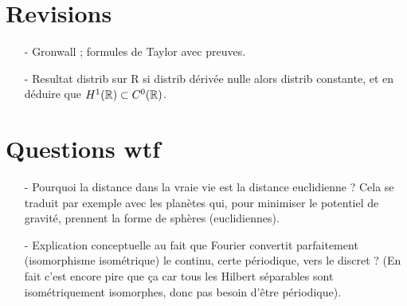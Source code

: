 \documentclass[11pt,a4paper]{article}
\begin{document}
\section{Revisions}
\begin{itemize}
\item[-] Gronwall ; formules de Taylor avec preuves.
\item[-] Resultat distrib sur R si distrib dérivée nulle alors distrib constante, et en déduire que $H^1(\mathbb R) \subset C^0(\mathbb R)$.
\end{itemize}

\section{Questions wtf}
\begin{itemize}
\item[-] Pourquoi la distance dans la vraie vie est la distance euclidienne ? Cela se traduit par exemple avec les planètes qui, pour minimiser le potentiel de gravité, prennent la forme de sphères (euclidiennes). \\
\item[-] Explication conceptuelle au fait que Fourier convertit parfaitement (isomorphisme isométrique) le continu, certe périodique, vers le discret ? (En fait c'est encore pire que ça car tous les Hilbert séparables sont isométriquement isomorphes, donc pas besoin d'être périodique).
\end{itemize}
\end{document}
